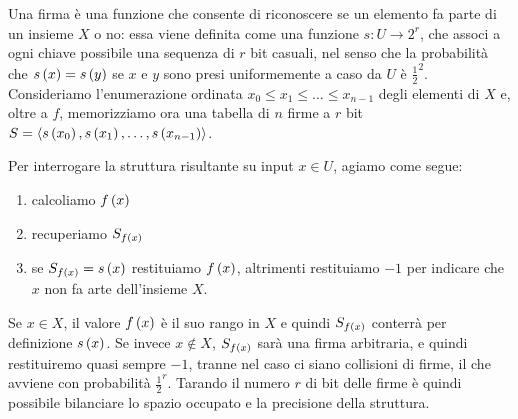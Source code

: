 \documentclass[\main/main.tex]{subfiles}
\begin{document}
\begin{definition}[Firma]
    Una firma è una funzione che consente di riconoscere se un elemento fa parte di un insieme \(X\) o no: essa viene definita come una funzione \(s: U \rightarrow 2^r\), che associ a ogni chiave possibile una sequenza di \(r\) bit casuali, nel senso che la probabilità che \(s\left(x\right) = s\left(y\right)\) se \(x\) e \(y\) sono presi uniformemente a caso da \(U\) è \(\frac{1}{2}^2\). Consideriamo l'enumerazione ordinata \(x_0 \leq x_1 \leq \ldots \leq x_{n-1}\) degli elementi di \(X\) e, oltre a \(f\), memorizziamo ora una tabella di \(n\) firme a \(r\) bit \(S = \left\langle s\left(x_0\right), s\left(x_1\right), \ldots, s\left(x_{n-1}\right)\right\rangle\).
    
    Per interrogare la struttura risultante su input \(x \in U\), agiamo come segue:
    \begin{enumerate}
        \item calcoliamo \(f\left(x\right)\)
        \item recuperiamo \(S_{f\left(x\right)}\)
        \item se \(S_{f\left(x\right)} = s\left(x\right)\) restituiamo \(f\left(x\right)\), altrimenti restituiamo \(-1\) per indicare che \(x\) non fa arte dell'insieme \(X\).
    \end{enumerate}
    Se \(x \in X\), il valore \(f\left(x\right)\) è il suo rango in \(X\) e quindi \(S_{f\left(x\right)}\) conterrà per definizione \(s\left(x\right)\). Se invece \(x \not\in X\), \(S_{f\left(x\right)}\) sarà una firma arbitraria, e quindi restituiremo quasi sempre \(-1\), tranne nel caso ci siano collisioni di firme, il che avviene con probabilità \(\frac{1}{2}^r\). Tarando il numero \(r\) di bit delle firme è quindi possibile bilanciare lo spazio occupato e la precisione della struttura.
\end{definition}
\end{document}
